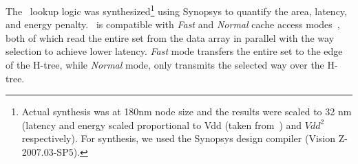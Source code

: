 

The \AC\ lookup logic was synthesized\footnote{Actual synthesis was at 180nm node size and the results were scaled to 32 nm (latency and energy scaled proportional to Vdd (taken from~\cite{cpudb}) and $Vdd^2$ respectively). For synthesis, we used the Synopsys design compiler (Vision Z-2007.03-SP5).} using Synopsys to quantify the area, latency, and energy penalty. \AC\ is compatible with  \textit{Fast} and \textit{Normal} cache access modes~\cite[-access-mode config]{muralimanohar-micro-2007}, both of which read the entire set from the data array in parallel with the way selection to  achieve lower latency. \textit{Fast} mode transfers the entire set to the edge of the H-tree, while  \textit{Normal} mode, only transmits the selected way over the H-tree. 







